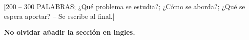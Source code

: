 [200 – 300 PALABRAS; ¿Qué problema se estudia?; ¿Cómo se aborda?; ¿Qué se espera aportar? – Se escribe al final.] \par
\textbf{No olvidar añadir la sección en ingles.}